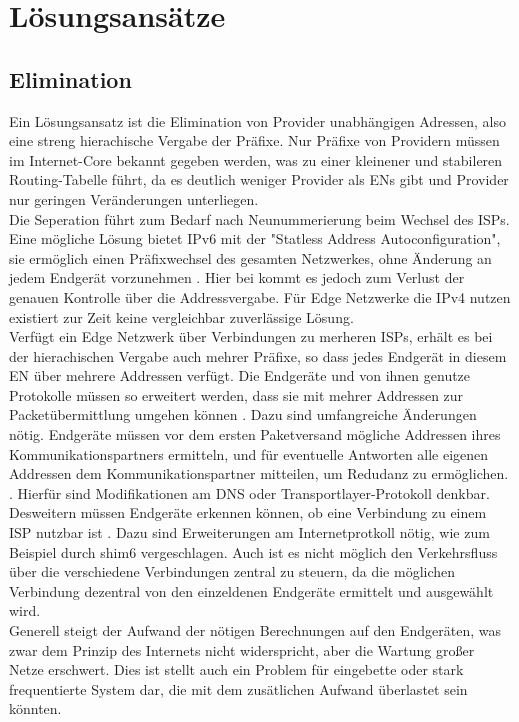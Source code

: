 \section{Lösungsansätze}
\subsection{Elimination}
Ein Lösungsansatz ist die Elimination von Provider unabhängigen Adressen, also eine streng hierachische Vergabe der Präfixe. Nur Präfixe von Providern müssen im Internet-Core bekannt gegeben werden, was zu einer kleinener und stabileren Routing-Tabelle führt, da es deutlich weniger Provider als ENs gibt und Provider nur geringen Veränderungen unterliegen.\\

Die Seperation führt zum Bedarf nach Neunummerierung beim Wechsel des ISPs. Eine mögliche Lösung bietet IPv6 mit der "Statless Address Autoconfiguration", sie ermöglich einen Präfixwechsel des gesamten Netzwerkes, ohne Änderung an jedem Endgerät vorzunehmen \cite{RFC4862}. Hier bei kommt es jedoch zum Verlust der genauen Kontrolle über die Addressvergabe. Für Edge Netzwerke die IPv4 nutzen existiert zur Zeit keine vergleichbar zuverlässige Lösung.\\

Verfügt ein Edge Netzwerk über Verbindungen zu merheren ISPs, erhält es bei der hierachischen Vergabe auch mehrer Präfixe, so dass jedes Endgerät in diesem EN über mehrere Addressen verfügt. Die Endgeräte und von ihnen genutze Protokolle müssen so erweitert werden, dass sie mit mehrer Addressen zur Packetübermittlung umgehen können \cite{jen:2008:start}. Dazu sind umfangreiche Änderungen nötig. Endgeräte müssen vor dem ersten Paketversand mögliche Addressen ihres Kommunikationspartners ermitteln, und für eventuelle Antworten alle eigenen Addressen dem Kommunikationspartner mitteilen, um Redudanz zu ermöglichen. \cite{jen:2008:start}. Hierfür sind Modifikationen am DNS oder Transportlayer-Protokoll denkbar. Desweitern müssen Endgeräte erkennen können, ob eine Verbindung zu einem ISP nutzbar ist \cite{jen:2008:start}. Dazu sind Erweiterungen am Internetprotkoll nötig, wie zum Beispiel durch shim6 vergeschlagen. Auch ist es nicht möglich den Verkehrsfluss über die verschiedene Verbindungen zentral zu steuern, da die möglichen Verbindung dezentral von den einzeldenen Endgeräte ermittelt und ausgewählt wird. \\

Generell steigt der Aufwand der nötigen Berechnungen auf den Endgeräten, was zwar dem Prinzip des Internets nicht widerspricht, aber die Wartung großer Netze erschwert. Dies ist stellt auch ein Problem für eingebette oder stark frequentierte System dar, die mit dem zusätlichen Aufwand überlastet sein könnten. \\

